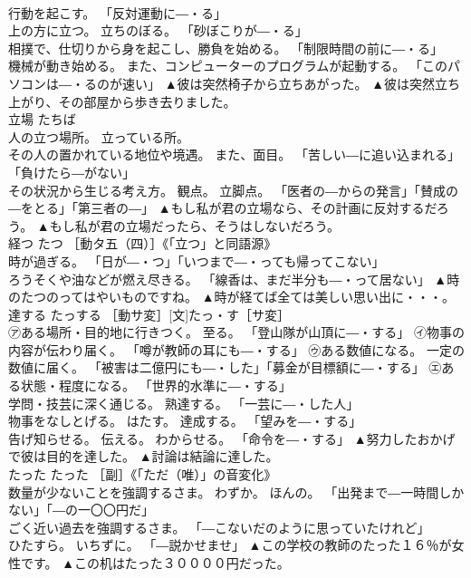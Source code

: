 \documentclass[8pt]{extreport}
\begin{document}
\begin{CJK}{UTF8}{min}
\\	行動を起こす。 「反対運動に―・る」 
\\	上の方に立つ。 立ちのぼる。 「砂ぼこりが―・る」 
\\	相撲で、仕切りから身を起こし、勝負を始める。 「制限時間の前に―・る」 
\\	機械が動き始める。 また、コンピューターのプログラムが起動する。 「このパソコンは―・るのが速い」	▲彼は突然椅子から立ちあがった。 ▲彼は突然立ち上がり、その部屋から歩き去りました。
\\	立場	たちば	
\\	人の立つ場所。 立っている所。 
\\	その人の置かれている地位や境遇。 また、面目。 「苦しい―に追い込まれる」「負けたら―がない」 
\\	その状況から生じる考え方。 観点。 立脚点。 「医者の―からの発言」「賛成の―をとる」「第三者の―」	▲もし私が君の立場なら、その計画に反対するだろう。 ▲もし私が君の立場だったら、そうはしないだろう。
\\	経つ	たつ	［動タ五（四）］《「立つ」と同語源》 
\\	時が過ぎる。 「日が―・つ」「いつまで―・っても帰ってこない」 
\\	ろうそくや油などが燃え尽きる。 「線香は、まだ半分も―・って居ない」	▲時のたつのってはやいものですね。 ▲時が経てば全ては美しい思い出に・・・。
\\	達する	たっする	［動サ変］[文]たっ・す［サ変］ 
\\	㋐ある場所・目的地に行きつく。 至る。 「登山隊が山頂に―・する」 ㋑物事の内容が伝わり届く。 「噂が教師の耳にも―・する」 ㋒ある数値になる。 一定の数値に届く。 「被害は二億円にも―・した」「募金が目標額に―・する」 ㋓ある状態・程度になる。 「世界的水準に―・する」 
\\	学問・技芸に深く通じる。 熟達する。 「一芸に―・した人」 
\\	物事をなしとげる。 はたす。 達成する。 「望みを―・する」 
\\	告げ知らせる。 伝える。 わからせる。 「命令を―・する」	▲努力したおかげで彼は目的を達した。 ▲討論は結論に達した。
\\	たった	たった	［副］《「ただ（唯）」の音変化》 
\\	数量が少ないことを強調するさま。 わずか。 ほんの。 「出発まで―一時間しかない」「―の一〇〇円だ」 
\\	ごく近い過去を強調するさま。 「―こないだのように思っていたけれど」 
\\	ひたすら。 いちずに。 「―説かせませ」	▲この学校の教師のたった１６％が女性です。 ▲この机はたった３００００円だった。

\end{CJK}
\end{document}
